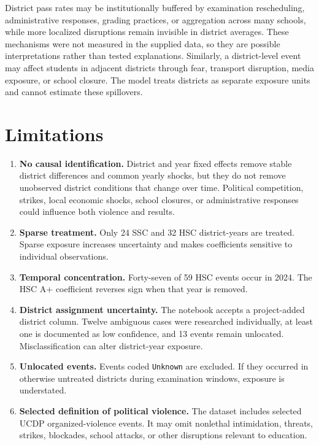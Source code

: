 \documentclass[11pt]{article}
\begin{document}
District pass rates may be institutionally buffered by examination rescheduling, administrative responses, grading practices, or aggregation across many schools, while more localized disruptions remain invisible in district averages. These mechanisms were not measured in the supplied data, so they are possible interpretations rather than tested explanations. Similarly, a district-level event may affect students in adjacent districts through fear, transport disruption, media exposure, or school closure. The model treats districts as separate exposure units and cannot estimate these spillovers.

\section{Limitations}

\begin{enumerate}
  \item \textbf{No causal identification.} District and year fixed effects remove stable district differences and common yearly shocks, but they do not remove unobserved district conditions that change over time. Political competition, strikes, local economic shocks, school closures, or administrative responses could influence both violence and results.

  \item \textbf{Sparse treatment.} Only 24 SSC and 32 HSC district-years are treated. Sparse exposure increases uncertainty and makes coefficients sensitive to individual observations.

  \item \textbf{Temporal concentration.} Forty-seven of 59 HSC events occur in 2024. The HSC A+ coefficient reverses sign when that year is removed.

  \item \textbf{District assignment uncertainty.} The notebook accepts a project-added district column. Twelve ambiguous cases were researched individually, at least one is documented as low confidence, and 13 events remain unlocated. Misclassification can alter district-year exposure.

  \item \textbf{Unlocated events.} Events coded \texttt{Unknown} are excluded. If they occurred in otherwise untreated districts during examination windows, exposure is understated.

  \item \textbf{Selected definition of political violence.} The dataset includes selected UCDP organized-violence events. It may omit nonlethal intimidation, threats, strikes, blockades, school attacks, or other disruptions relevant to education.


\end{enumerate}
\end{document}
